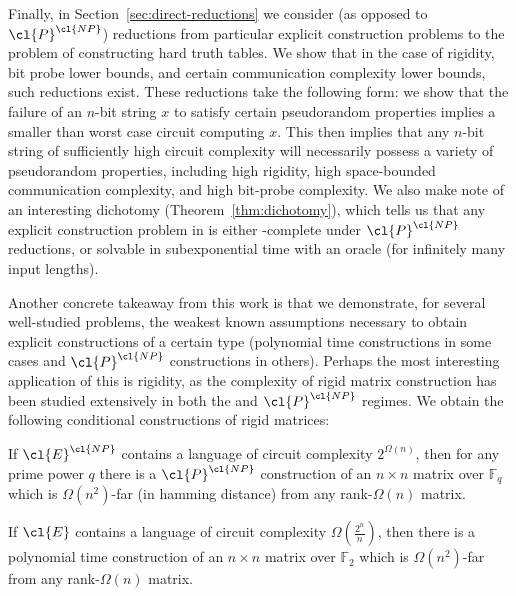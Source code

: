 Finally, in Section~\ref{sec:direct-reductions} we consider  (as opposed to $\cl{P}^\cl{NP}$) reductions from particular explicit construction problems to the problem of constructing hard truth tables. We show that in the case of rigidity, bit probe lower bounds, and certain communication complexity lower bounds, such reductions exist. These reductions take the following form: we show that the failure of an $n$-bit string $x$ to satisfy certain pseudorandom properties implies a smaller than worst case circuit computing $x$. This then implies that any $n$-bit string of sufficiently high circuit complexity will necessarily possess a variety of pseudorandom properties, including high rigidity, high space-bounded communication complexity, and high bit-probe complexity. We also make note of an interesting dichotomy (Theorem~\ref{thm:dichotomy}), which tells us that any explicit construction problem in  is either -complete under $\cl{P}^\cl{NP}$ reductions, or solvable in subexponential time with an  oracle (for infinitely many input lengths).

Another concrete takeaway from this work is that we demonstrate, for several well-studied problems, the weakest known assumptions necessary to obtain explicit constructions of a certain type (polynomial time constructions in some cases and $\cl{P}^\cl{NP}$ constructions in others). Perhaps the most interesting application of this is rigidity, as the complexity of rigid matrix construction has been studied extensively in both the  and $\cl{P}^\cl{NP}$ regimes. We obtain the following conditional constructions of rigid matrices:

\begin{theorem*}
If $\cl{E}^\cl{NP}$ contains a language of circuit complexity $2^{\Omega(n)}$, then for any prime power $q$ there is a $\cl{P}^\cl{NP}$ construction of an $n \times n$ matrix over $\mathbb{F}_q$ which is $\Omega(n^2)$-far (in hamming distance) from any rank-$\Omega(n)$ matrix.
\end{theorem*}

\begin{theorem*}
If $\cl{E}$ contains a language of circuit complexity $\Omega(\frac{2^n}{n})$, then there is a polynomial time construction of an $n \times n$ matrix over $\mathbb{F}_2$ which is $\Omega(n^2)$-far from any rank-$\Omega(n)$ matrix.
\end{theorem*}

